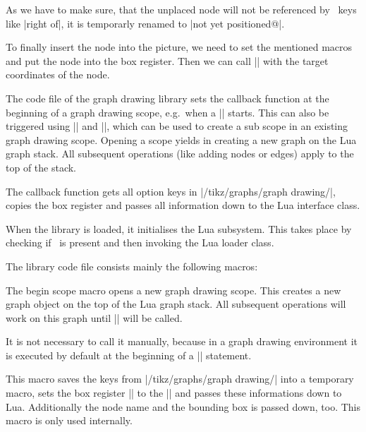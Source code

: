 As we have to make sure, that the unplaced node will not be referenced by \tikzname\ keys like |right of|, it is temporarly renamed to |not yet positioned@|.

To finally
insert the node into the picture, we need to set the mentioned macros
and put the node into the box register. Then we can call
|\pgfpositionnodenow| with the target coordinates of the node.

The code file of the graph drawing library sets the callback function
at the beginning of a graph drawing scope, e.g.\ when a |\graph|
starts. This can also be triggered using |\pgfgdbeginscope| and
|\pgfgdendscope|, which can be used to create a sub scope in an
existing graph drawing scope. Opening a scope yields in creating a new
graph on the Lua graph stack. All subsequent operations (like adding
nodes or edges) apply to the top of the stack. 


The callback function gets all option keys in
|/tikz/graphs/graph drawing/|, copies the box register and passes all information down to the Lua interface class.

When the library is loaded, it initialises the Lua subsystem. This takes place by checking if \LuaTeX\ is present and then invoking the Lua loader class. 

The library code file consists mainly the following macros:

\begin{command}{\pgfgdbeginscope}
  The begin scope macro opens a new graph drawing scope. This creates a new graph object on the top of the Lua graph stack. All subsequent operations will work on this graph until |\pgfgdendscope| will be called.

It is not necessary to call it manually, because in a graph drawing environment it is executed by default at the beginning of a |\graph| statement.
\end{command}


\makeatletter
\begin{command}{\pgf@gd@positionnode@callback}
  This macro saves the keys from |/tikz/graphs/graph drawing/| into a temporary macro, sets the box register |\pgf@gd@box| to the |\pgfpositionnodelaterbox| and passes these informations down to Lua. Additionally the node name and the bounding box is passed down, too. This macro is only used internally.
\end{command}
\makeatother

